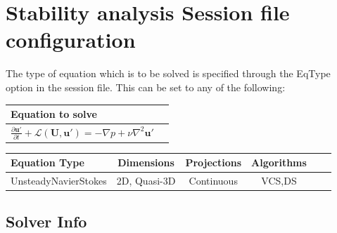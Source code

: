 \section{Stability analysis Session file configuration}
\label{SecStabFile}
The type of equation which is to be solved is specified through the \inltt
{EqType} option in the session file. This can be set to any of the following:

\begin{center}
\footnotesize
\begin{tabular}{lc}
\toprule
{Equation to solve}  \\
\midrule
$\frac{\partial\mathbf{u'}}{\partial t} +\mathcal{L}(\mathbf{U},\mathbf{u'})=-\nabla p+\nu \nabla^2 \mathbf{u'}$\\
\bottomrule
\end{tabular}
\end{center}


\begin{center}
\footnotesize
\begin{tabular}{lccccc}
\toprule
{Equation Type} & {Dimensions} &{Projections} &{Algorithms} \\
\midrule
UnsteadyNavierStokes & 2D, Quasi-3D& Continuous &VCS,DS\\
\bottomrule
\end{tabular}
\end{center}

\subsection{Solver Info}
\label{SectionIncNS_SolverInfo_Stab}

